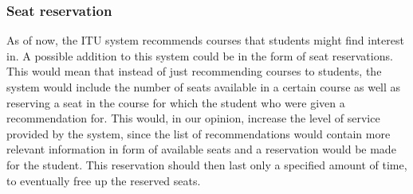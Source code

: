 \subsubsection*{Seat reservation}
As of now, the ITU system recommends courses that students might find interest in. A possible addition to this system could be in the form of seat reservations.\newline 
This would mean that instead of just recommending courses to students, the system would include the number of seats available in a certain course as well as reserving a seat in the course for which the student who were given a recommendation for. This would, in our opinion, increase the level of service provided by the system, since the list of recommendations would contain more relevant information in form of available seats and a reservation would be made for the student. This reservation should then last only a specified amount of time, to eventually free up the reserved seats.\newline


